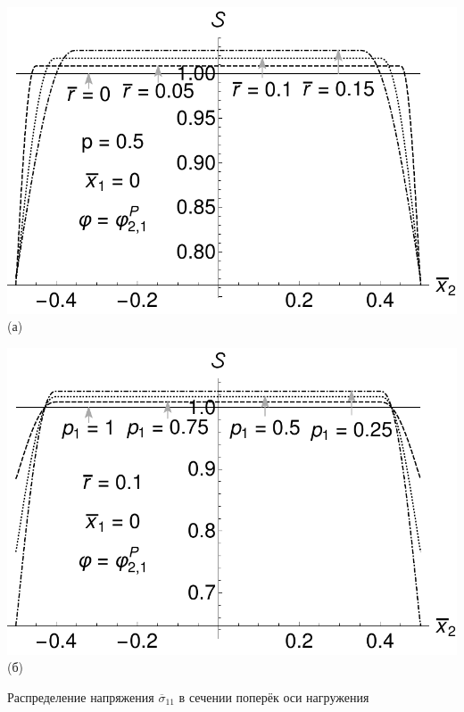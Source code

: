 \begin{frame}
	\begin{minipage}{0.35\textwidth}
		\centering
		\includegraphics[width=\textwidth]{pics/HeatFluxStabilityVariationR.pdf} \\
		(а)
	\end{minipage}
	\begin{minipage}{0.35\textwidth}
		\centering
		\includegraphics[width=\textwidth]{pics/HeatFluxStabilityVariationP1.pdf} \\
		(б)
	\end{minipage}
	
	Распределение напряжения $\overline{\sigma}_{11}$ в сечении поперёк оси нагружения
\end{frame}

